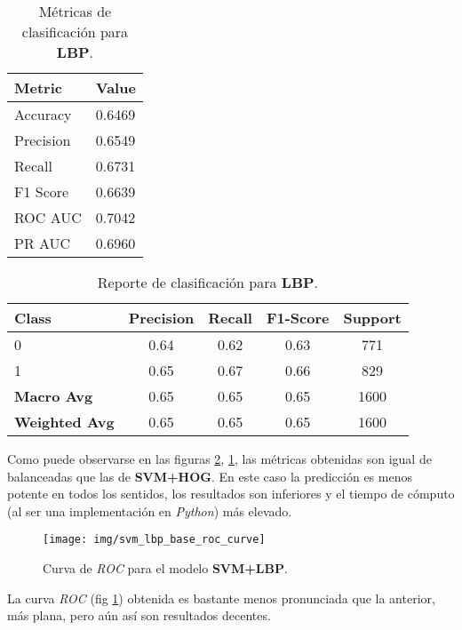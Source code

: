 \documentclass[12pt,letterpaper]{article}
\begin{document}
\begin{table}[htp]
    \centering
    \begin{tabular}{ll}
    \hline
    \textbf{Metric} & \textbf{Value} \\
    \hline
    Accuracy    & 0.6469 \\
    Precision   & 0.6549 \\
    Recall      & 0.6731 \\
    F1 Score    & 0.6639 \\
    ROC AUC     & 0.7042 \\
    PR AUC      & 0.6960 \\
    \hline
    \end{tabular}
    \caption{Métricas de clasificación para \textbf{LBP}.}
    \label{tab:classification_metrics_lbp}
\end{table}

\begin{table}[htp]
    \centering
    \begin{tabular}{lcccc}
    \hline
    \textbf{Class} & \textbf{Precision} & \textbf{Recall} & \textbf{F1-Score} & \textbf{Support} \\
    \hline
    0 & 0.64 & 0.62 & 0.63 & 771 \\
    1 & 0.65 & 0.67 & 0.66 & 829 \\
    \hline
    \textbf{Macro Avg} & 0.65 & 0.65 & 0.65 & 1600 \\
    \textbf{Weighted Avg} & 0.65 & 0.65 & 0.65 & 1600 \\
    \hline
    \end{tabular}
    \caption{Reporte de clasificación para \textbf{LBP}.}
    \label{tab:classification_report_lbp}
\end{table}

Como puede observarse en las figuras \ref{tab:classification_report_lbp}, \ref{tab:classification_metrics_lbp}, las métricas obtenidas son igual de balanceadas que las de \textbf{SVM+HOG}. En este caso la predicción es menos potente en todos los sentidos, los resultados son inferiores y el tiempo de cómputo (al ser una implementación en \textit{Python}) más elevado.

\begin{figure}[htp]
    \centering
    \texttt{[image: img/svm\_lbp\_base\_roc\_curve]}
    \caption{Curva de \textit{ROC} para el modelo \textbf{SVM+LBP}.}
    \label{fig:roc_lbp}
\end{figure}

La curva \textit{ROC} (fig \ref{fig:roc_lbp}) obtenida es bastante menos pronunciada que la anterior, más plana, pero aún así son resultados decentes.
\end{document}
